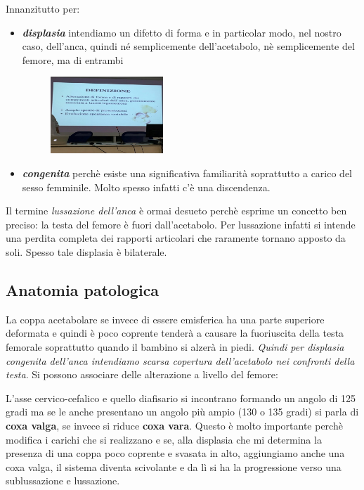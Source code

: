 Innanzitutto per:
\begin{itemize}
\item \textbf{\emph{displasia}} intendiamo un difetto di forma e in particolar modo, nel nostro caso, dell'anca, quindi né semplicemente dell'acetabolo, nè semplicemente del femore, ma di entrambi

\begin{figure}[!ht]
\centering
\includegraphics[width=0.4\textwidth]{018/image2.jpeg}
\end{figure}

\item \textbf{\emph{congenita}} perchè esiste una significativa familiarità soprattutto a carico del sesso femminile. Molto spesso infatti c'è una discendenza.
\end{itemize}

Il termine \emph{lussazione dell'anca} è ormai desueto perchè esprime un concetto ben preciso: la testa del femore è fuori dall'acetabolo. Per lussazione infatti si intende una perdita completa dei rapporti articolari che raramente tornano apposto da soli. Spesso tale displasia
è bilaterale.

\subsection{Anatomia patologica}

La coppa acetabolare se invece di essere emisferica ha una parte superiore deformata e quindi è poco coprente tenderà a causare la fuoriuscita della testa femorale soprattutto quando il bambino si alzerà in piedi. \emph{Quindi per displasia congenita dell'anca intendiamo scarsa copertura dell'acetabolo nei confronti della testa}. Si possono
associare delle alterazione a livello del femore:

L'asse cervico-cefalico e quello diafisario si incontrano formando un angolo di 125 gradi ma se le anche presentano un angolo più ampio (130 o 135 gradi) si parla di \textbf{coxa valga}, se invece si riduce \textbf{coxa vara}. Questo è molto importante perchè modifica i carichi
che si realizzano e se, alla displasia che mi determina la presenza di una coppa poco coprente e svasata in alto, aggiungiamo anche una coxa valga, il sistema diventa scivolante e da lì si ha la progressione verso una sublussazione e lussazione.

